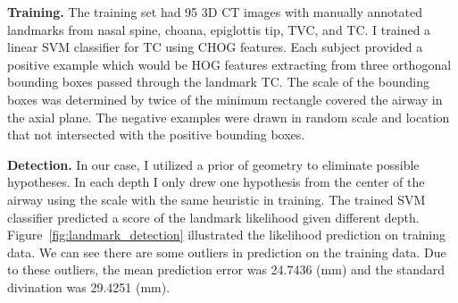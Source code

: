 {\bf Training.} 
The training set had 95 3D CT images with manually annotated landmarks from nasal spine, choana, epiglottis tip, TVC, and TC.
I trained a linear SVM classifier for TC using CHOG features.
Each subject provided a positive example which would be HOG features extracting from three orthogonal bounding boxes passed through the landmark TC.
The scale of the bounding boxes was determined by twice of the minimum rectangle covered the airway in the axial plane.
The negative examples were drawn in random scale and location that not intersected with the positive bounding boxes.

{\bf Detection.}
In our case, I utilized a prior of geometry to eliminate possible hypotheses.
In each depth I only drew one hypothesis from the center of the airway using the scale with the same heuristic in training.
The trained SVM classifier predicted a score of the landmark likelihood given different depth.
Figure~\ref{fig:landmark_detection} illustrated the likelihood prediction on training data.
We can see there are some outliers in prediction on the training data.
Due to these outliers, the mean prediction error was 24.7436 (mm) and the standard divination was 29.4251 (mm).

